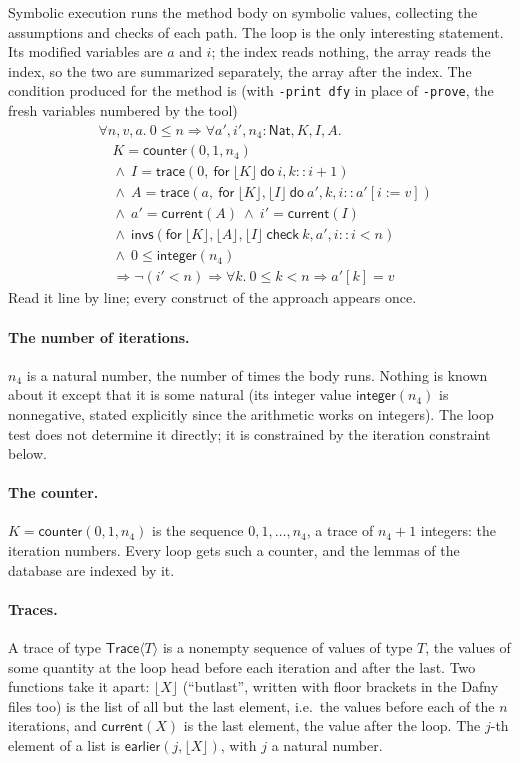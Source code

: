 \documentclass[11pt,a4paper]{article}
\newcommand{\bl}[1]{\lfloor #1\rfloor}                       %
\newcommand{\tr}[3]{\mathsf{trace}(#1,\ \mathsf{for}\ #2\ \mathsf{do}\ #3)}
\newcommand{\al}[2]{\mathsf{invs}(\mathsf{for}\ #1\ \mathsf{check}\ #2)}
\newcommand{\cnt}{\mathsf{counter}}
\newcommand{\cur}{\mathsf{current}}
\newcommand{\ear}{\mathsf{earlier}}
\newcommand{\intf}{\mathsf{integer}}
\begin{document}
Symbolic execution runs the method body on symbolic values, collecting the assumptions and checks of each path. The
loop is the only interesting statement. Its modified variables are $a$ and $i$; the index reads nothing, the array
reads the index, so the two are summarized separately, the array after the index. The condition produced for the
method is (with \texttt{-print dfy} in place of \texttt{-prove}, the fresh variables numbered by the tool)
\begin{align*}
&\forall n, v, a.\ 0 \le n \Rightarrow \forall a', i', n_4{:}\mathsf{Nat}, K, I, A.\\
&\quad K = \cnt(0, 1, n_4)\\
&\quad \wedge\ I = \tr{0}{\bl{K}}{i, k :: i + 1}\\
&\quad \wedge\ A = \tr{a}{\bl{K}, \bl{I}}{a', k, i :: a'[i := v]}\\
&\quad \wedge\ a' = \cur(A)\ \wedge\ i' = \cur(I)\\
&\quad \wedge\ \al{\bl{K}, \bl{A}, \bl{I}}{k, a', i :: i < n}\\
&\quad \wedge\ 0 \le \intf(n_4)\\
&\quad \Rightarrow \neg(i' < n) \Rightarrow \forall k.\ 0 \le k < n \Rightarrow a'[k] = v
\end{align*}
Read it line by line; every construct of the approach appears once.

\paragraph{The number of iterations.} $n_4$ is a natural number, the number of times the body runs. Nothing is
known about it except that it is some natural (its integer value $\intf(n_4)$ is nonnegative, stated explicitly
since the arithmetic works on integers). The loop test does not determine it directly; it is constrained by the
iteration constraint below.

\paragraph{The counter.} $K = \cnt(0, 1, n_4)$ is the sequence $0, 1, \ldots, n_4$, a trace of $n_4 + 1$ integers:
the iteration numbers. Every loop gets such a counter, and the lemmas of the database are indexed by it.

\paragraph{Traces.} A trace of type $\mathsf{Trace}\langle T\rangle$ is a nonempty sequence of values of type $T$,
the values of some quantity at the loop head before each iteration and after the last. Two functions take it
apart: $\bl{X}$ (``butlast'', written with floor brackets in the Dafny files too) is the list of all but
the last element, i.e.\ the values before each of the $n$ iterations, and $\cur(X)$ is the last element, the value
after the loop. The $j$-th element of a list is $\ear(j, \bl{X})$, with $j$ a natural number.
\end{document}
